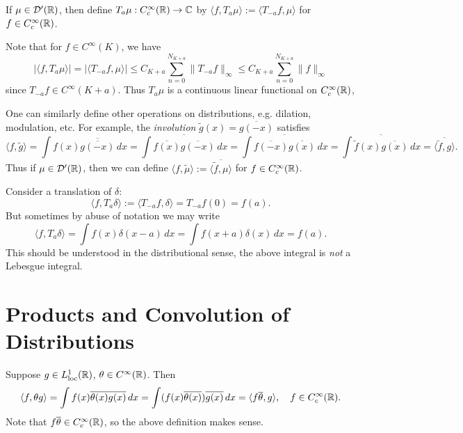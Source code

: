 \begin{definition}
  If $\mu \in \mathcal{D}'(\mathbb{R})$, then
  define $T_a \mu : C^\infty_c(\mathbb{R}) \to \mathbb{C}$ by
  $\langle f, T_a \mu \rangle := \langle T_{-a} f, \mu \rangle$
  for $f \in C^\infty_c(\mathbb{R})$.
\end{definition}

\begin{remark}
  Note that for $f \in C^\infty(K)$, we have
  \[
    |\langle f, T_a \mu \rangle|
    = |\langle T_{-a} f, \mu \rangle|
    \le C_{K + a} \sum_{n = 0}^{N_{K + a}} \|T_{-a} f\|_\infty
    \le C_{K + a} \sum_{n = 0}^{N_{K + a}} \|f\|_\infty
  \]
  since $T_{-a} f \in C^\infty(K + a)$.
  Thus $T_a \mu$ is a continuous
  linear functional on $C^\infty_c(\mathbb{R})$,
\end{remark}

\begin{remark}
  One can similarly define other operations
  on distributions, e.g.
  dilation, modulation, etc.
  For example, the \emph{involution}
  $\widetilde{g}(x) = \overline{g(-x)}$
  satisfies
  \[
    \langle f, \widetilde{g} \rangle
    = \int f(x) \overline{\overline{g(-x)}} \, dx
    = \overline{\int \overline{f(x)} \overline{g(-x)} \, dx}
    = \overline{\int \overline{f(-x)} \overline{g(x)} \, dx}
    = \overline{\int \widetilde{f}(x) \overline{g(x)} \, dx}
    = \overline{\langle \widetilde{f}, g \rangle}.
  \]
  Thus if $\mu \in \mathcal{D}'(\mathbb{R})$,
  then we can define
  $\langle f, \widetilde{\mu} \rangle := \overline{\langle \widetilde{f}, \mu \rangle}$
  for $f \in C^\infty_c(\mathbb{R})$.
\end{remark}

\begin{example}
  Consider a translation of $\delta$:
  \[
    \langle f, T_a \delta \rangle
    := \langle T_{-a} f, \delta \rangle
    = T_{-a} f(0)
    = f(a).
  \]
  But sometimes by abuse of
  notation we may write
  \[
    \langle f, T_a\delta \rangle
    = \int f(x) \delta(x - a)\, dx
    = \int f(x + a) \delta(x)\, dx
    = f(a).
  \]
  This should be understood in the
  distributional sense, the
  above integral is \emph{not} a Lebesgue integral.
\end{example}

\section{Products and Convolution of Distributions}

\begin{remark}
  Suppose $g \in L^1_{\mathrm{loc}}(\mathbb{R})$,
  $\theta \in C^\infty(\mathbb{R})$. Then
  \[
    \langle f, \theta g \rangle
    = \int f(x) \overline{\theta(x) g(x)} \, dx
    = \int (f(x) \overline{\theta(x)}) \overline{g(x)} \, dx
    = \langle f \overline{\theta}, g \rangle,
    \quad f \in C^\infty_c(\mathbb{R}).
  \]
  Note that $f\overline{\theta} \in C^\infty_c(\mathbb{R})$,
  so the above definition makes sense.
\end{remark}

